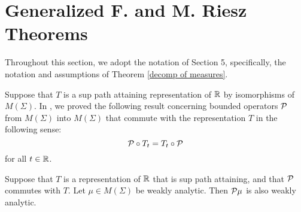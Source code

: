\documentclass[12pt,leqno]{article}
\def\R{\Bbb R}
\def\cP{{\cal P}}
\begin{document}
\section{Generalized F. and M. Riesz Theorems}


Throughout this section, 
we adopt the notation of Section 5, specifically, 
the notation and assumptions of 
Theorem \ref{decomp of measures}.

Suppose that $T$ is a sup path attaining representation of $\R$ by isomorphisms of $M(\Sigma)$.
In \cite{amss}, we proved the following 
result concerning bounded operators $\cP$
from $M(\Sigma)$ into $M(\Sigma)$
that commute with the representation $T$ in the following sense:
$$\cP\circ T_t=T_t\circ \cP$$
for all $t\in \R$.  
\begin{thm}
Suppose that $T$ is a representation of $\R$ that is sup path
attaining,
and that $\cP$ commutes with $T$.
Let $\mu\in M(\Sigma)$ be weakly analytic.
Then $\cP \mu$ is also weakly analytic.
\label{caseofR}
\end{thm}
\end{document}
